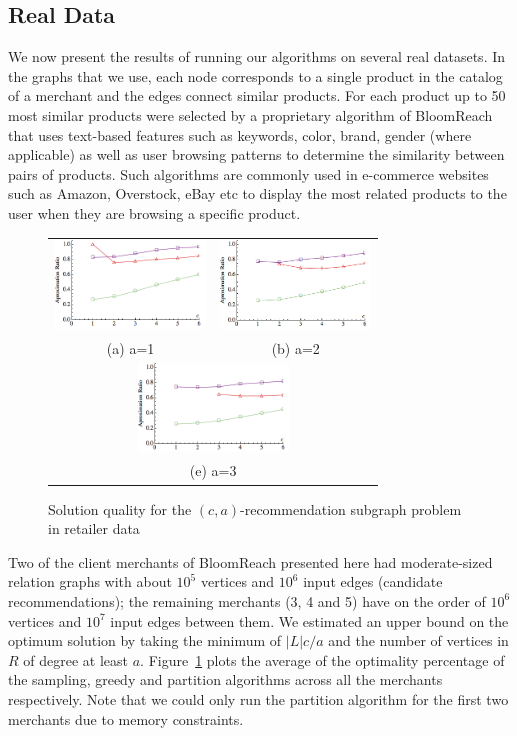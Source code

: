 \subsection{Real Data}

We now present the results of running our algorithms on several real
datasets. In the graphs that we use, each node corresponds to a single
product in the catalog of a merchant and the edges connect similar
products. For each product up to 50 most similar products were
selected by a proprietary algorithm of BloomReach that uses text-based
features such as keywords, color, brand, gender (where applicable) as
well as user browsing patterns to determine the similarity between
pairs of products. Such algorithms are commonly used in e-commerce websites
such as Amazon, Overstock, eBay etc to display the most related products 
to the user when they are browsing a specific product.  

\begin{figure}
\begin{tabular}{cc}
  \includegraphics[width=40mm]{images/real_a=1_new.png} &   \includegraphics[width=40mm]{images/real_a=2_new.png} \\
(a) a=1 & (b) a=2 \\[6pt]
\multicolumn{2}{c}{\includegraphics[width=40mm]{images/real_a=3_new.png} }\\
\multicolumn{2}{c}{(e) a=3}
\end{tabular}
\caption{Solution quality for the $(c, a)$-recommendation subgraph problem in retailer data}
\label{fig:real_combo}
\end{figure}


Two of the client merchants of BloomReach presented here had
moderate-sized relation graphs with about $10^5$ vertices and $10^6$
input edges (candidate recommendations); the remaining merchants (3, 4
and 5) have on the order of $10^6$ vertices and $10^7$ input edges
between them.  We estimated an upper bound on the optimum solution by
taking the minimum of $|L|c/a$ and the number of vertices in $R$ of
degree at least $a$. Figure~\ref{fig:real_combo} plots the average
of the optimality percentage of the sampling, greedy and partition
algorithms across all the merchants respectively. Note that we could
only run the partition algorithm for the first two merchants due to memory constraints.  



